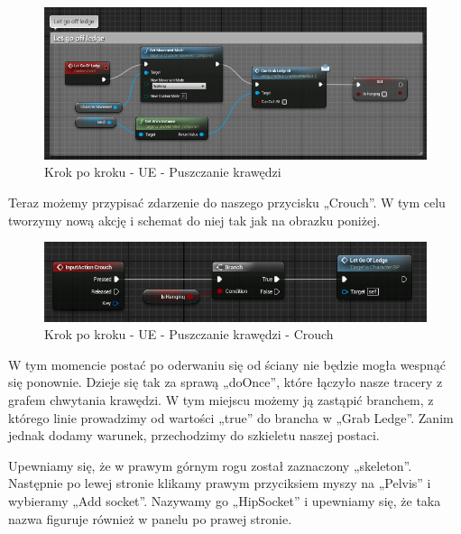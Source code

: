 \documentclass[12pt]{xmgr}
\begin{document}
\begin{figure}[!htb]
    \begin{center}
    \includegraphics[scale=0.5]{Screeny/UeKrokPoKroku/LetGoOfLedge}
    \end{center}
    \caption{Krok po kroku - UE - Puszczanie krawędzi}
\end{figure}

Teraz możemy przypisać zdarzenie do naszego przycisku „Crouch”. W tym celu tworzymy nową akcję i schemat do niej tak jak na obrazku poniżej.

\begin{figure}[!htb]
    \begin{center}
    \includegraphics[scale=0.5]{Screeny/UeKrokPoKroku/Crouch}
    \end{center}
    \caption{Krok po kroku - UE - Puszczanie krawędzi - Crouch}
\end{figure}

W tym momencie postać po oderwaniu się od ściany nie będzie mogła wespnąć się ponownie. Dzieje się tak za sprawą „doOnce”, które łączyło nasze tracery z grafem chwytania krawędzi. W tym miejscu możemy ją zastąpić branchem, z którego linie prowadzimy od wartości „true” do brancha w „Grab Ledge”. Zanim jednak dodamy warunek, przechodzimy do szkieletu naszej postaci.

Upewniamy się, że w prawym górnym rogu został zaznaczony „skeleton”. Następnie po lewej stronie klikamy prawym przyciksiem myszy na „Pelvis” i wybieramy „Add socket”. Nazywamy go „HipSocket” i upewniamy się, że taka nazwa figuruje również w panelu po prawej stronie.
\end{document}
